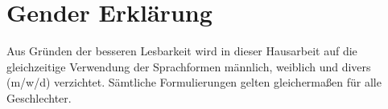 \thispagestyle{empty}
\section*{\Huge{Gender Erklärung}}

Aus Gründen der besseren Lesbarkeit wird in dieser Hausarbeit auf die gleichzeitige Verwendung der Sprachformen männlich,
weiblich und divers (m/w/d) verzichtet. Sämtliche Formulierungen gelten gleichermaßen für alle Geschlechter.
\newpage
